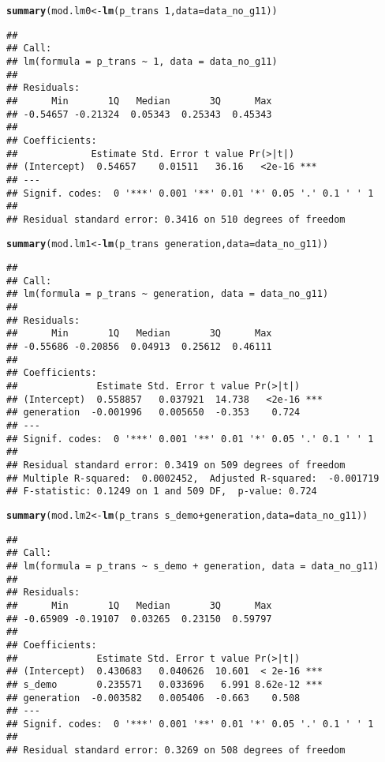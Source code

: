 \documentclass{article}\usepackage[]{graphicx}\usepackage[]{xcolor}
\makeatletter
\newcommand{\hlnum}[1]{\textcolor[rgb]{0.686,0.059,0.569}{#1}}%
\newcommand{\hlopt}[1]{\textcolor[rgb]{0,0,0}{#1}}%
\newcommand{\hlstd}[1]{\textcolor[rgb]{0.345,0.345,0.345}{#1}}%
\newcommand{\hlkwb}[1]{\textcolor[rgb]{0.69,0.353,0.396}{#1}}%
\newcommand{\hlkwc}[1]{\textcolor[rgb]{0.333,0.667,0.333}{#1}}%
\newcommand{\hlkwd}[1]{\textcolor[rgb]{0.737,0.353,0.396}{\textbf{#1}}}%
\newenvironment{kframe}{%
 \def\at@end@of@kframe{}%
 \ifinner\ifhmode%
  \def\at@end@of@kframe{\end{minipage}}%
  \begin{minipage}{\columnwidth}%
 \fi\fi%
 \def\FrameCommand##1{\hskip\@totalleftmargin \hskip-\fboxsep
 \colorbox{shadecolor}{##1}\hskip-\fboxsep
     \hskip-\linewidth \hskip-\@totalleftmargin \hskip\columnwidth}%
 \MakeFramed {\advance\hsize-\width
   \@totalleftmargin\z@ \linewidth\hsize
   \@setminipage}}%
 {\par\unskip\endMakeFramed%
 \at@end@of@kframe}
\newenvironment{knitrout}{}{} %
\makeatother
\begin{document}
\begin{knitrout}
\begin{kframe}
\begin{alltt}
\hlkwd{summary}\hlstd{(mod.lm0}\hlkwb{<-}\hlkwd{lm}\hlstd{(p_trans} \hlopt{~} \hlnum{1}\hlstd{,}\hlkwc{data}\hlstd{=data_no_g11))}
\end{alltt}
\begin{verbatim}
## 
## Call:
## lm(formula = p_trans ~ 1, data = data_no_g11)
## 
## Residuals:
##      Min       1Q   Median       3Q      Max 
## -0.54657 -0.21324  0.05343  0.25343  0.45343 
## 
## Coefficients:
##             Estimate Std. Error t value Pr(>|t|)    
## (Intercept)  0.54657    0.01511   36.16   <2e-16 ***
## ---
## Signif. codes:  0 '***' 0.001 '**' 0.01 '*' 0.05 '.' 0.1 ' ' 1
## 
## Residual standard error: 0.3416 on 510 degrees of freedom
\end{verbatim}
\begin{alltt}
\hlkwd{summary}\hlstd{(mod.lm1}\hlkwb{<-}\hlkwd{lm}\hlstd{(p_trans} \hlopt{~} \hlstd{generation,}\hlkwc{data}\hlstd{=data_no_g11))}
\end{alltt}
\begin{verbatim}
## 
## Call:
## lm(formula = p_trans ~ generation, data = data_no_g11)
## 
## Residuals:
##      Min       1Q   Median       3Q      Max 
## -0.55686 -0.20856  0.04913  0.25612  0.46111 
## 
## Coefficients:
##              Estimate Std. Error t value Pr(>|t|)    
## (Intercept)  0.558857   0.037921  14.738   <2e-16 ***
## generation  -0.001996   0.005650  -0.353    0.724    
## ---
## Signif. codes:  0 '***' 0.001 '**' 0.01 '*' 0.05 '.' 0.1 ' ' 1
## 
## Residual standard error: 0.3419 on 509 degrees of freedom
## Multiple R-squared:  0.0002452,	Adjusted R-squared:  -0.001719 
## F-statistic: 0.1249 on 1 and 509 DF,  p-value: 0.724
\end{verbatim}
\begin{alltt}
\hlkwd{summary}\hlstd{(mod.lm2}\hlkwb{<-}\hlkwd{lm}\hlstd{(p_trans} \hlopt{~} \hlstd{s_demo}\hlopt{+}\hlstd{generation,}\hlkwc{data}\hlstd{=data_no_g11))}
\end{alltt}
\begin{verbatim}
## 
## Call:
## lm(formula = p_trans ~ s_demo + generation, data = data_no_g11)
## 
## Residuals:
##      Min       1Q   Median       3Q      Max 
## -0.65909 -0.19107  0.03265  0.23150  0.59797 
## 
## Coefficients:
##              Estimate Std. Error t value Pr(>|t|)    
## (Intercept)  0.430683   0.040626  10.601  < 2e-16 ***
## s_demo       0.235571   0.033696   6.991 8.62e-12 ***
## generation  -0.003582   0.005406  -0.663    0.508    
## ---
## Signif. codes:  0 '***' 0.001 '**' 0.01 '*' 0.05 '.' 0.1 ' ' 1
## 
## Residual standard error: 0.3269 on 508 degrees of freedom

\end{verbatim}
\end{kframe}
\end{knitrout}
\end{document}
